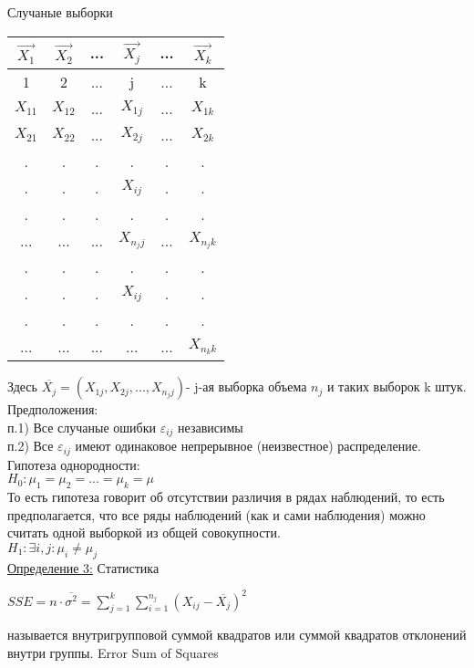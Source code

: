 \documentclass[a4paper]{article}
\begin{document}
\begin{center}
Случаные выборки\\
\begin{tabular}{ |  c  |   c   |   c   |   c   |   c   |   c   |} 
\hline
 $\overrightarrow{X_1}$ & $\overrightarrow{X_2}$ & ... &$\overrightarrow{X_j}$ & ... &$\overrightarrow{X_k}$\\
 \hline
 1 & 2 & ... & j & ... & k\\
 \hline
 $X_{11}$ & $X_{12}$ & ... &$X_{1j}$ & ... &$X_{1k}$\\
 \hline
 $X_{21}$ & $X_{22}$ & ... &$X_{2j}$ & ... &$X_{2k}$\\
 \hline
 . & .& . & . & . &.\\
 . & .& . &$X_{ij}$ & . &.\\
 . & .& . & . & . &.\\
 \hline
 ... & ... & ... &$X_{n_{j}j}$ & ... &$X_{n_{j}k}$\\
 \hline
 . & .& . & . & . &.\\
 . & .& . &$X_{ij}$ & . &.\\
 . & .& . & . & . &.\\
 \hline
 ... & ... & ... &... & ... &$X_{n_{k}k}$\\
 \hline
\end{tabular}
\end{center}
Здесь $\overline{X_j} = (X_{1j}, X_{2j},...,X_{n_jj})$- j-ая выборка объема $n_j$ и таких выборок k штук.\\
Предположения:\\п.1) Все случаные ошибки $\varepsilon_{ij}$ независимы\\п.2) Все $\varepsilon_{ij}$ имеют одинаковое непрерывное (неизвестное) распределение.\\
Гипотеза однородности:\\
$H_0: \mu_1 = \mu_2 = ... = \mu_k = \mu$\\
То есть гипотеза говорит об отсутствии различия в рядах наблюдений, то есть предполагается, что все ряды наблюдений (как и сами наблюдения) можно считать одной выборкой из общей совокупности.\\
$H_1: \exists i,j: \mu_i\neq\mu_j$\\
\underline{Определение 3:} Статистика
\begin{center}
    $SSE = n\cdot\overline{\sigma^2} = \sum\limits_{j = 1}^{k}\sum\limits_{i = 1}^{n_j}(X_{ij} - \overline{X_j})^2$
\end{center}
называется внутригрупповой суммой квадратов или суммой квадратов отклонений внутри группы. Error Sum of Squares\\
\end{document}

